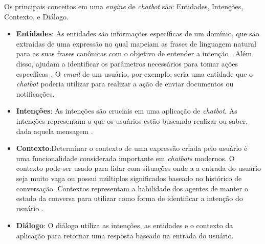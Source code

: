 Os principais conceitos em uma \textit{engine} de \textit{chatbot} são: Entidades, Intenções, Contexto, e Diálogo.


\begin{itemize}
    \item \textbf{Entidades}: As entidades são informações específicas de um domínio, que são
extraídas de uma expressão no qual mapeiam as frases de linguagem natural para as suas frases
canônicas com o objetivo de entender a intenção \cite{kar2016applying}. Além disso, ajudam a identificar os parâmetros necessários para tomar ações específicas \cite{kar2016applying}. O \textit{email} de um usuário, por exemplo, seria uma entidade que o \textit{chatbot} poderia utilizar para realizar a ação de enviar documentos ou notificações.

    \item \textbf{Intenções}: As intenções são cruciais em uma aplicação de \textit{chatbot}. As intenções
representam o que os usuários estão buscando realizar ou saber, dada aquela mensagem \cite{kar2016applying}. 
    \item \textbf{Contexto}:Determinar o contexto de uma expressão criada pelo usuário é uma
funcionalidade considerada importante em \textit{chatbots} modernos. O contexto pode ser usado
para lidar com situações onde a a entrada do usuário seja muito vaga ou possui múltiplos
significados baseado no histórico de conversação. Contextos representam a habilidade dos
agentes de manter o estado da conversa para utilizar como forma de identificar a intenção do
usuário \cite{kar2016applying}.
    \item \textbf{Diálogo}: O diálogo utiliza as intenções, as entidades e o contexto da aplicação para
retornar uma resposta baseado na entrada do usuário.
    
\end{itemize}

